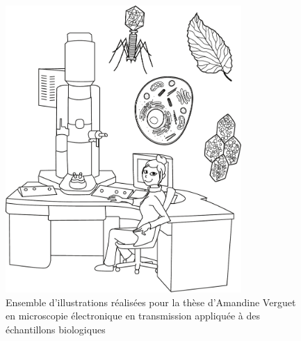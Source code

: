 \begin{figure}
    \centering
    \includegraphics[width=0.8\textwidth]{img/annexe_projets_annexe/these_amandine.pdf}
    \caption[Ensemble d'illustrations réalisées pour la thèse d'Amandine Verguet en microscopie électronique en transmission appliquée à des échantillons biologiques]{Ensemble d'illustrations réalisées pour la thèse d'Amandine Verguet en microscopie électronique en transmission appliquée à des échantillons biologiques \cite{Verguet2019Dec}}
    \label{fig:annexe_these_amandine}
\end{figure}
